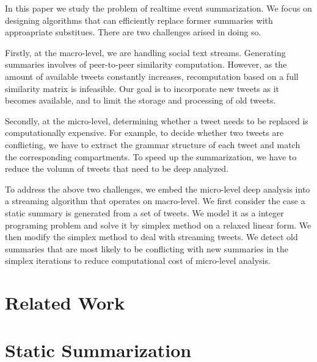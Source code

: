 \documentclass{article}
\begin{document}
In this paper we study the problem of realtime event summarization. We focus on designing algorithms that can efficiently replace former summaries with approapriate substitues. There are two challenges arised in doing so.

Firstly, at the macro-level, we are handling social text streams. Generating summaries involves of peer-to-peer similarity computation. However, as the amount of available tweets constantly increases, recomputation based on a full similarity matrix is infeasible. Our goal is to incorporate new tweets as it becomes available, and to limit the storage and processing of old tweets. 

Secondly, at the micro-level, determining whether a tweet needs to be replaced is computationally expensive. For example, to decide whether two tweets are conflicting, we have to extract the grammar structure of each tweet and match the corresponding compartments. To speed up the summarization, we have to reduce the volumn of tweets that need to be deep analyzed.   

To address the above two challenges, we embed the micro-level deep analysis into a streaming algorithm that operates on macro-level. We first consider the case a static summary is generated from a set of tweets. We model it as a integer programing problem and solve it by simplex method on a relaxed linear form. We then modify the simplex method to deal with streaming tweets. We detect old summaries that are most likely to be conflicting with new summaries in the simplex iterations to reduce computational cost of micro-level analysis. 




\section{Related Work}

\section{Static Summarization}
\end{document}
